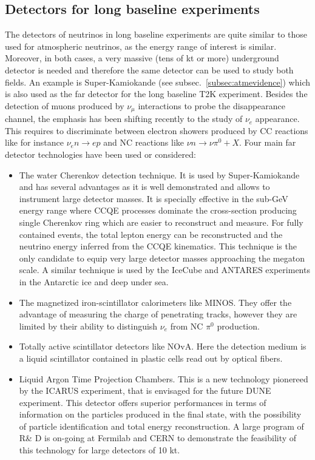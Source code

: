 \subsection{Detectors for long baseline experiments}

The detectors of neutrinos in long baseline experiments are quite similar to those used for atmospheric neutrinos, as the energy range of interest is similar. Moreover, in both cases, a very massive (tens of kt or more) underground detector is needed and therefore the same detector can be used to study both fields. An example is Super-Kamiokande (see subsec.~\ref{subsec:atmevidence}) which is also used as the far detector for the long baseline T2K experiment. 
Besides the detection of muons produced by $\nu_\mu$ interactions to probe the disappearance channel, the emphasis has been shifting recently to the study of $\nu_e$ appearance. This requires to discriminate between electron showers produced by CC reactions like for instance $ \nu_e n \rightarrow e p$ and NC reactions like $\nu n \rightarrow \nu \pi^0 + X$.
Four main far detector technologies have been used or considered: 
\begin{itemize}
\item The water Cherenkov detection technique. It is used by Super-Kamiokande and has several advantages as it is well demonstrated and allows to instrument large detector masses. It is specially effective in the sub-GeV energy range where CCQE processes dominate the cross-section producing single Cherenkov ring which are easier to reconstruct and measure. For fully contained events, the total lepton energy can be reconstructed and the neutrino energy inferred from the CCQE kinematics. This technique is the only candidate to equip very large detector masses approaching the megaton scale.
A similar technique is used by the IceCube and ANTARES experiments in the Antarctic ice and deep under sea.
\item The magnetized iron-scintillator calorimeters like MINOS. They offer the advantage of measuring the charge of penetrating tracks, however they are limited by their ability to distinguish $\nu_e$ from NC $\pi^0$ production.
\item Totally active scintillator detectors like NOvA. Here the detection medium is a liquid scintillator contained in plastic cells read out by optical fibers.
\item Liquid Argon Time Projection Chambers. This is a new technology pionereed by the ICARUS experiment, that is envisaged for the future DUNE experiment. This detector offers superior performances in terms of information on the particles produced in the final state, with the possibility of particle identification and total energy reconstruction. A large program of R\& D is on-going at Fermilab and CERN to demonstrate the feasibility of this technology for large detectors of 10 kt.
\end{itemize}

